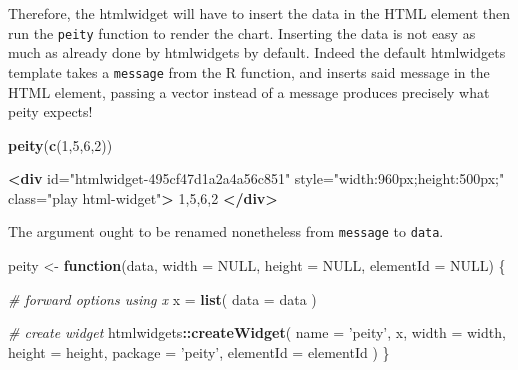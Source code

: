 \documentclass[10pt,]{krantz}
\makeatletter
\newenvironment{Shaded}{\begin{snugshade}}{\end{snugshade}}
\newcommand{\CommentTok}[1]{\textcolor[rgb]{0.37,0.37,0.37}{\textit{#1}}}
\newcommand{\ControlFlowTok}[1]{\textcolor[rgb]{0.27,0.27,0.27}{\textbf{#1}}}
\newcommand{\DataTypeTok}[1]{\textcolor[rgb]{0.27,0.27,0.27}{#1}}
\newcommand{\DecValTok}[1]{\textcolor[rgb]{0.06,0.06,0.06}{#1}}
\newcommand{\KeywordTok}[1]{\textcolor[rgb]{0.27,0.27,0.27}{\textbf{#1}}}
\newcommand{\NormalTok}[1]{#1}
\newcommand{\OperatorTok}[1]{\textcolor[rgb]{0.43,0.43,0.43}{\textbf{#1}}}
\newcommand{\OtherTok}[1]{\textcolor[rgb]{0.37,0.37,0.37}{#1}}
\newcommand{\StringTok}[1]{\textcolor[rgb]{0.5,0.5,0.5}{#1}}
\newenvironment{kframe}{%
\medskip{}
\setlength{\fboxsep}{.8em}
 \def\at@end@of@kframe{}%
 \ifinner\ifhmode%
  \def\at@end@of@kframe{\end{minipage}}%
  \begin{minipage}{\columnwidth}%
 \fi\fi%
 \def\FrameCommand##1{\hskip\@totalleftmargin \hskip-\fboxsep
 \colorbox{shadecolor}{##1}\hskip-\fboxsep
     \hskip-\linewidth \hskip-\@totalleftmargin \hskip\columnwidth}%
 \MakeFramed {\advance\hsize-\width
   \@totalleftmargin\z@ \linewidth\hsize
   \@setminipage}}%
 {\par\unskip\endMakeFramed%
 \at@end@of@kframe}
\renewenvironment{Shaded}{\begin{kframe}}{\end{kframe}}
\makeatother
\begin{document}
Therefore, the htmlwidget will have to insert the data in the HTML element then run the \texttt{peity} function to render the chart. Inserting the data is not easy as much as already done by htmlwidgets by default. Indeed the default htmlwidgets template takes a \texttt{message} from the R function, and inserts said message in the HTML element, passing a vector instead of a message produces precisely what peity expects!

\begin{Shaded}
\begin{Highlighting}[]
\KeywordTok{peity}\NormalTok{(}\KeywordTok{c}\NormalTok{(}\DecValTok{1}\NormalTok{,}\DecValTok{5}\NormalTok{,}\DecValTok{6}\NormalTok{,}\DecValTok{2}\NormalTok{))}
\end{Highlighting}
\end{Shaded}

\begin{Shaded}
\begin{Highlighting}[]
\KeywordTok{<div} 
\OtherTok{  id=}\StringTok{"htmlwidget-495cf47d1a2a4a56c851"} 
\OtherTok{  style=}\StringTok{"width:960px;height:500px;"} 
\OtherTok{  class=}\StringTok{"play html-widget"}\KeywordTok{>}
\NormalTok{  1,5,6,2}
\KeywordTok{</div>}
\end{Highlighting}
\end{Shaded}

The argument ought to be renamed nonetheless from \texttt{message} to \texttt{data}.

\begin{Shaded}
\begin{Highlighting}[]
\NormalTok{peity <-}\StringTok{ }\ControlFlowTok{function}\NormalTok{(data, }\DataTypeTok{width =} \OtherTok{NULL}\NormalTok{, }\DataTypeTok{height =} \OtherTok{NULL}\NormalTok{, }
  \DataTypeTok{elementId =} \OtherTok{NULL}\NormalTok{) \{}

  \CommentTok{# forward options using x}
\NormalTok{  x =}\StringTok{ }\KeywordTok{list}\NormalTok{(}
    \DataTypeTok{data =}\NormalTok{ data}
\NormalTok{  )}

  \CommentTok{# create widget}
\NormalTok{  htmlwidgets}\OperatorTok{::}\KeywordTok{createWidget}\NormalTok{(}
    \DataTypeTok{name =} \StringTok{'peity'}\NormalTok{,}
\NormalTok{    x,}
    \DataTypeTok{width =}\NormalTok{ width,}
    \DataTypeTok{height =}\NormalTok{ height,}
    \DataTypeTok{package =} \StringTok{'peity'}\NormalTok{,}
    \DataTypeTok{elementId =}\NormalTok{ elementId}
\NormalTok{  )}
\NormalTok{\}}
\end{Highlighting}
\end{Shaded}
\end{document}
